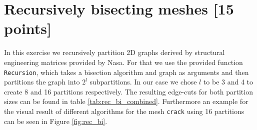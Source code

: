 \section{Recursively bisecting meshes [15 points]}
In this exercise we recursively partition 2D graphs derived by structural engineering matrices provided by Nasa. For that we use the provided function \texttt{Recursion}, which takes a bisection algorithm and graph as arguments and then partitions the graph into $2^l$ subpartitions. In our case we chose $l$ to be 3 and 4 to create 8 and 16 partitions respectively. The resulting edge-cuts for both partition sizes can be found in table \ref{tab:rec_bi_combined}.
Furthermore an example for the visual result of different algorithms for the mesh \texttt{crack} using 16 partitions can be seen in Figure \ref{fig:rec_bi}.
\begin{table}[H]
	\centering
	\caption{Edge cut results for recursive bi-partitioning using 8 and 16 partitions.}
	\label{tab:rec_bi_combined}
\end{table}



